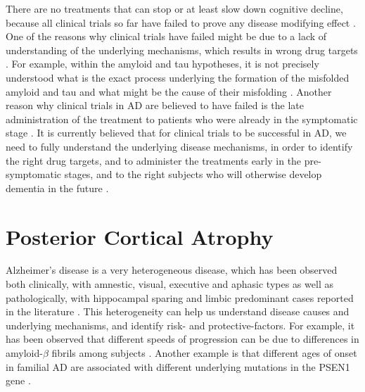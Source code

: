 There are no treatments that can stop or at least slow down cognitive decline, because all clinical trials so far have failed to prove any disease modifying effect \cite{mudher2002alzheimer}. One of the reasons why clinical trials have failed might be due to a lack of understanding of the underlying mechanisms, which results in wrong drug targets \cite{mehta2017trials}. For example, within the amyloid and tau hypotheses, it is not precisely understood what is the exact process underlying the formation of the misfolded amyloid and tau and what might be the cause of their misfolding \cite{mudher2002alzheimer}. Another reason why clinical trials in AD are believed to have failed is the late administration of the treatment to patients who were already in the symptomatic stage \cite{mehta2017trials}. It is currently believed that for clinical trials to be successful in AD, we need to fully understand the underlying disease mechanisms, in order to identify the right drug targets, and to administer the treatments early in the pre-symptomatic stages, and to the right subjects who will otherwise develop dementia in the future \cite{mehta2017trials}. 


\section{Posterior Cortical Atrophy}

Alzheimer's disease is a very heterogeneous disease, which has been observed both clinically, with amnestic, visual, executive and aphasic types \cite{galton2000atypical} as well as pathologically, with hippocampal sparing and limbic predominant cases reported in the literature \cite{murray2011neuropathologically}. This heterogeneity can help us understand disease causes and underlying mechanisms, and identify risk- and protective-factors. For example, it has been observed that different speeds of progression can be due to differences in amyloid-$\beta$ fibrils among subjects \cite{qiang2017structural}. Another example is that different ages of onset in familial AD are associated with different underlying mutations in the PSEN1 gene \cite{larner2006clinical}.  

